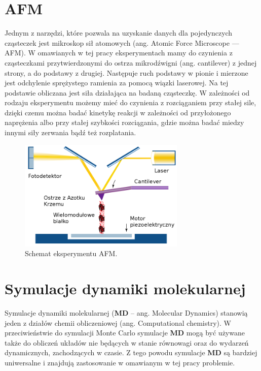 \section{AFM}

Jednym z narzędzi, które pozwala na uzyskanie danych dla pojedynczych cząsteczek jest mikroskop sił atomowych (ang. Atomic Force Microscope --- AFM). W omawianych w tej pracy eksperymentach mamy do czynienia z cząsteczkami przytwierdzonymi do ostrza mikrodźwigni (ang. cantilever) z jednej strony, a do podstawy z drugiej. Następuje ruch podstawy w pionie i mierzone jest odchylenie sprężystego ramienia za pomocą wiązki laserowej. Na tej podstawie obliczana jest siła działająca na badaną cząsteczkę. W zależności od rodzaju eksperymentu możemy mieć do czynienia z rozciąganiem przy stałej sile, dzięki czemu można badać kinetykę reakcji w zależności od przyłożonego naprężenia\cite{Fernandez} albo przy stałej szybkości rozciągania, gdzie można badać miedzy innymi siły zerwania bądź też rozplatania\cite{Carrion-Vazquez30031999, Fisher1999379}. 

\begin{figure}[h]
\begin{centering}
\includegraphics[width=300px]{./rys/afm1.png}
\caption{Schemat eksperymentu AFM.}
\end{centering}
\end{figure}

\section{Symulacje dynamiki molekularnej}

Symulacje dynamiki molekularnej (\textbf{MD} -- ang. Molecular Dynamics) stanowią jeden z działów chemii obliczeniowej (ang. Computational chemistry). W przeciwieństwie do symulacji Monte Carlo symulacje \textbf{MD} mogą być używane także do obliczeń układów nie będących w stanie równowagi oraz do wydarzeń dynamicznych, zachodzących w czasie. Z tego powodu symulacje \textbf{MD} są bardziej uniwersalne i znajdują zastosowanie w omawianym w tej pracy problemie\cite{Gromacs_manual}.


